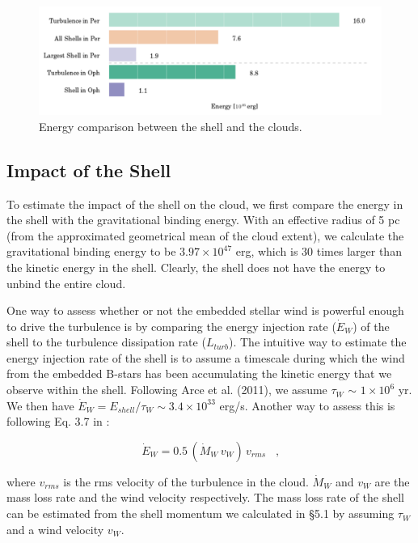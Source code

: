 \documentclass[11pt,a4paper]{emulateapj}
\begin{document}
\begin{figure}[ht]
\centering
\includegraphics[scale=0.35]{fig/bar_energy.png}
\caption{Energy comparison between the shell and the clouds.
}
\end{figure}

\subsection{Impact of the Shell}
To estimate the impact of the shell on the cloud, we first compare the energy in the shell with the gravitational binding energy. With an effective radius of 5 pc (from the approximated geometrical mean of the cloud extent), we calculate the gravitational binding energy to be $3.97\times10^{47}$ erg, which is 30 times larger than the kinetic energy in the shell. Clearly, the shell does not have the energy to unbind the entire cloud.

One way to assess whether or not the embedded stellar wind is powerful enough to drive the turbulence is by comparing the energy injection rate ($\dot E_W$) of the shell to the turbulence dissipation rate ($L_{turb}$). The intuitive way to estimate the energy injection rate of the shell is to assume a timescale during which the wind from the embedded B-stars has been accumulating the kinetic energy that we observe within the shell. Following Arce et al. (2011), we assume $\tau_W$ $\sim$ $1\times10^6$ yr. We then have $\dot E_W = E_{shell}/\tau_W \sim 3.4\times10^{33}$ erg/s. Another way to assess this is following Eq. 3.7 in \citet{McKee_1989}:

\begin{equation}
\dot E_W = 0.5\,(\dot M_W\,v_W)\,v_{rms}\;\;\;\text{,}
\end{equation}

where $v_{rms}$ is the rms velocity of the turbulence in the cloud. $\dot M_W$ and $v_W$ are the mass loss rate and the wind velocity respectively. The mass loss rate of the shell can be estimated from the shell momentum we calculated in \S5.1 by assuming $\tau_W$ and a wind velocity $v_W$.
\end{document}
